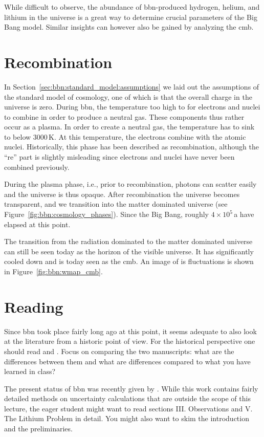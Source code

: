 While difficult to observe, the abundance of \ac{bbn}-produced hydrogen, helium, and lithium in the universe is a great way to determine crucial parameters of the Big Bang model. Similar insights can however also be gained by analyzing the \ac{cmb}.

\section{Recombination}

In Section~\ref{sec:bbn:standard_model:assumptions} we laid out the assumptions of the standard model of cosmology, one of which is that the overall charge in the universe is zero. During \ac{bbn}, the temperature too high to for electrons and nuclei to combine in order to produce a neutral gas. These components thus rather occur as a plasma. In order to create a neutral gas, the temperature has to sink to below $3000$\,K. At this temperature, the electrons combine with the atomic nuclei. Historically, this phase has been described as recombination, although the ``re'' part is slightly misleading since electrons and nuclei have never been combined previously.

During the plasma phase, i.e., prior to recombination, photons can scatter easily and the universe is thus opaque. After recombination the universe becomes transparent, and we transition into the matter dominated universe (see Figure~\ref{fig:bbn:cosmology_phases}). Since the Big Bang, roughly $4\times10^{5}$\,a have elapsed at this point.

The transition from the radiation dominated to the matter dominated universe can still be seen today as the horizon of the visible universe. It has significantly cooled down and is today seen as the \ac{cmb}. An image of is fluctuations is shown in Figure~\ref{fig:bbn:wmap_cmb}.


\section{Reading}

Since \ac{bbn} took place fairly long ago at this point, it seems adequate to also look at the literature from a historic point of view. For the historical perspective one should read \citet{alpher48} and \citet{peebles66prl}. Focus on comparing the two manuscripts: what are the differences between them and what are differences compared to what you have learned in class?

The present status of \ac{bbn} was recently given by \citet{cyburt16}. While this work contains fairly detailed methods on uncertainty calculations that are outside the scope of this lecture, the eager student might want to read sections III. Observations and V. The Lithium Problem in detail. You might also want to skim the introduction and the preliminaries.

